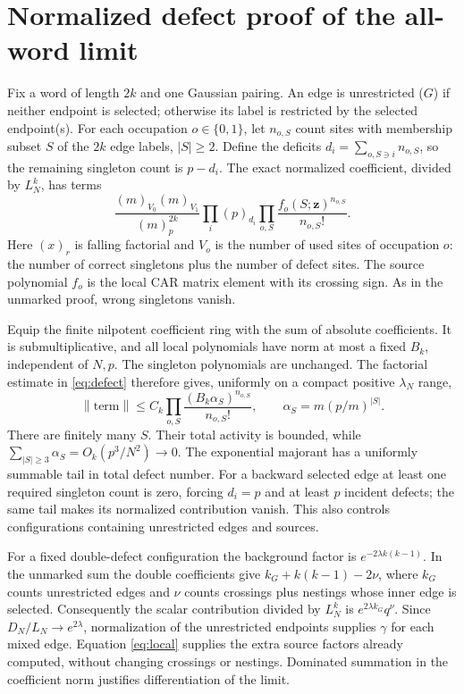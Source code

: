 \documentclass[11pt]{article}
\newcommand{\norm}[1]{\left\lVert#1\right\rVert}
\begin{document}
\newpage
\section{Normalized defect proof of the all-word limit}
Fix a word of length $2k$ and one Gaussian pairing. An edge is
unrestricted ($G$) if neither endpoint is selected; otherwise its label
is restricted by the selected endpoint(s). For each occupation
$o\in\{0,1\}$, let $n_{o,S}$ count sites with membership subset $S$ of
the $2k$ edge labels, $|S|\ge2$. Define the deficits
$d_i=\sum_{o,S\ni i}n_{o,S}$, so the remaining singleton count is $p-d_i$.
The exact normalized coefficient, divided by $L_N^k$, has terms
\begin{equation}\label{eq:defect}
 \frac{(m)_{V_0}(m)_{V_1}}{(m)_p^{2k}}
 \prod_i(p)_{d_i}
 \prod_{o,S}\frac{f_o(S;\boldsymbol z)^{n_{o,S}}}{n_{o,S}!}.
\end{equation}
Here $(x)_r$ is falling factorial and $V_o$ is the number of used sites
of occupation $o$: the number of correct singletons plus the number of
defect sites. The source polynomial $f_o$ is the local CAR matrix
element with its crossing sign. As in the unmarked proof, wrong
singletons vanish.

Equip the finite nilpotent coefficient ring with the sum of absolute
coefficients. It is submultiplicative, and all local polynomials have
norm at most a fixed $B_k$, independent of $N,p$. The singleton
polynomials are unchanged. The factorial estimate in \eqref{eq:defect}
therefore gives, uniformly on a compact positive $\lambda_N$ range,
\begin{equation}
 \norm{\text{term}}\le C_k
 \prod_{o,S}\frac{(B_k\alpha_S)^{n_{o,S}}}{n_{o,S}!},
 \qquad \alpha_S=m(p/m)^{|S|}.
\end{equation}
There are finitely many $S$. Their total activity is bounded, while
$\sum_{|S|\ge3}\alpha_S=O_k(p^3/N^2)\to0$. The exponential majorant
has a uniformly summable tail in total defect number. For a backward
selected edge at least one required singleton count is zero, forcing
$d_i=p$ and at least $p$ incident defects; the same tail makes its
normalized contribution vanish. This also controls configurations
containing unrestricted edges and sources.

For a fixed double-defect configuration the background factor is
$e^{-2\lambda k(k-1)}$. In the unmarked sum the double coefficients
give $k_G+k(k-1)-2\nu$, where $k_G$ counts unrestricted edges and
$\nu$ counts crossings plus nestings whose inner edge is selected.
Consequently the scalar contribution divided by $L_N^k$ is
$e^{2\lambda k_G}q^\nu$. Since $D_N/L_N\to e^{2\lambda}$, normalization
of the unrestricted endpoints supplies $\gamma$ for each mixed edge.
Equation \eqref{eq:local} supplies the extra source factors already
computed, without changing crossings or nestings. Dominated summation
in the coefficient norm justifies differentiation of the limit.
\end{document}
